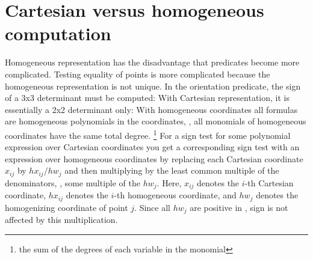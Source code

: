 \section{Cartesian versus homogeneous computation\label{sec:CartesianHomogeneousComputation}}
Homogeneous representation has the disadvantage that predicates become
more complicated. Testing equality of points is more complicated because
the homogeneous representation is not unique. In the orientation predicate,
the sign of a 3x3 determinant must be computed:
With Cartesian representation, it is essentially a 2x2 determinant only:
With homogeneous coordinates all formulas are homogeneous polynomials
in the coordinates, \ie, all monomials of homogeneous coordinates
have the same total degree.%
\footnote{the sum of the degrees of each variable in the monomial} 
%
For a sign test for some polynomial expression over Cartesian coordinates 
you get a corresponding sign test with an expression over homogeneous 
coordinates by replacing 
each Cartesian coordinate $x_{ij}$ by $hx_{ij}/hw_j$ and then multiplying by
the least common multiple of the denominators, \ie, some multiple of
the $hw_j$. 
Here, $x_{ij}$ denotes the $i$-th Cartesian coordinate,
$hx_{ij}$ denotes the $i$-th homogeneous coordinate, and
$hw_j$ denotes the homogenizing coordinate of point $j$.
Since all $hw_j$ are positive in \cgal, sign is not affected
by this multiplication. 

